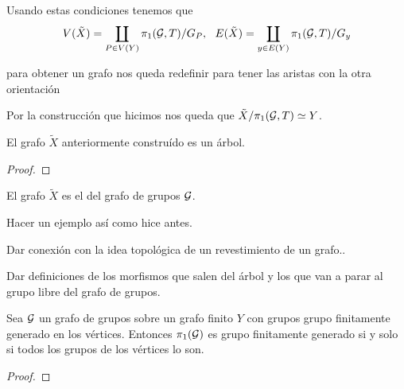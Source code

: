 \documentclass[tesis.tex]{subfiles}
\newcommand{\fg}{grupo finitamente generado }
\newcommand{\cG}{ {\cal G} }
\begin{document}
Usando estas condiciones tenemos que
\begin{equation*}
V(\tilde X) = \coprod_{P \in V(Y)} \pi_1(\cG, T) / G_P, \ \  E(\tilde X) = \coprod_{y \in E(Y)} \pi_1(\cG, T) / G_y
\end{equation*}

para obtener un grafo nos queda redefinir para tener las aristas con la otra orientación

\medskip

Por la construcción que hicimos nos queda que $\tilde X / \pi_1(\cG, T) \simeq Y$.

\begin{teo}[Serre]
	El grafo $\tilde X$ anteriormente construído es un árbol.
\end{teo}
\begin{proof}
\end{proof}


\begin{deff}
	El grafo $\tilde X$ es el  del grafo de grupos $\cG$.
\end{deff}

\begin{ej}
	Hacer un ejemplo así como hice antes.
\end{ej}

Dar conexión con la idea topológica de un revestimiento de un grafo..

Dar definiciones de los morfismos que salen del árbol y los que van a parar al grupo libre del grafo de grupos.


\begin{teo}
	Sea $\cal G$ un grafo de grupos sobre un grafo finito $Y$ con grupos \fg en los vértices.
	Entonces $\pi_1(\cal G)$ es \fg si y solo si todos los grupos de los vértices lo son.
\end{teo}

\begin{proof}
\end{proof}
\end{document}
